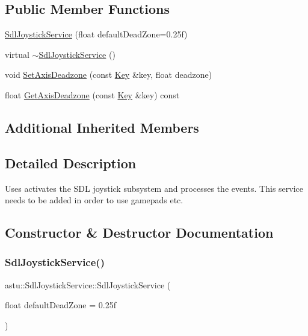 \subsection*{Public Member Functions}
\begin{DoxyCompactItemize}
\item 
\hyperlink{classastu_1_1SdlJoystickService_a87c82eadafbfa154f2530050dd75257e}{Sdl\+Joystick\+Service} (float default\+Dead\+Zone=0.\+25f)
\item 
virtual \hyperlink{classastu_1_1SdlJoystickService_ae30060b4090e8a16b0cc73596d923ce0}{$\sim$\+Sdl\+Joystick\+Service} ()
\item 
void \hyperlink{classastu_1_1SdlJoystickService_aed9cd0e2cd443e5592f74133df36ed68}{Set\+Axis\+Deadzone} (const \hyperlink{classastu_1_1Key}{Key} \&key, float deadzone)
\item 
float \hyperlink{classastu_1_1SdlJoystickService_a4f0681331183b7744e8cf78f6ddb4da4}{Get\+Axis\+Deadzone} (const \hyperlink{classastu_1_1Key}{Key} \&key) const
\end{DoxyCompactItemize}
\subsection*{Additional Inherited Members}


\subsection{Detailed Description}
Uses activates the S\+DL joystick subsystem and processes the events. This service needs to be added in order to use gamepads etc. 

\subsection{Constructor \& Destructor Documentation}
\mbox{\label{classastu_1_1SdlJoystickService_a87c82eadafbfa154f2530050dd75257e}} 
\subsubsection{\texorpdfstring{Sdl\+Joystick\+Service()}{SdlJoystickService()}}
{\footnotesize\ttfamily astu\+::\+Sdl\+Joystick\+Service\+::\+Sdl\+Joystick\+Service (\begin{DoxyParamCaption}\item[{float}]{default\+Dead\+Zone = {\ttfamily 0.25f} }\end{DoxyParamCaption})}

